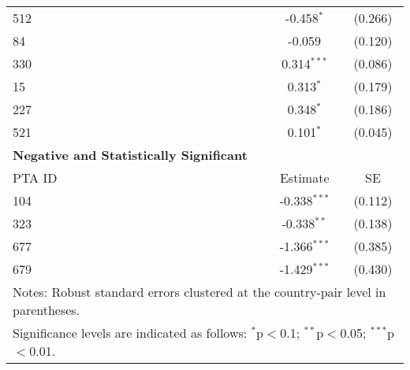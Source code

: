\begin{table}[htbp]
\begin{adjustbox}{max width=\textwidth}
\begin{tabular}{lcc}
    512 & -0.458$^{\ast}$ & (0.266) \\
    84  & -0.059 & (0.120) \\
    330 & 0.314$^{\ast\ast\ast}$ & (0.086) \\
    15  & 0.313$^{\ast}$ & (0.179) \\
    227 & 0.348$^{\ast}$ & (0.186) \\
    521 & 0.101$^{\ast}$ & (0.045) \\
    \hline
    \textbf{Negative and Statistically Significant} &  &  \\
    \hline
    PTA ID & Estimate & SE \\
    \hline
    104 & -0.338$^{\ast\ast\ast}$ & (0.112) \\
    323 & -0.338$^{\ast\ast}$ & (0.138) \\
    677 & -1.366$^{\ast\ast\ast}$ & (0.385) \\
    679 & -1.429$^{\ast\ast\ast}$ & (0.430) \\
    \hline
    \multicolumn{3}{l}{\footnotesize{Notes: Robust standard errors clustered at the country-pair level in parentheses.}} \\
    \multicolumn{3}{l}{\footnotesize{Significance levels are indicated as follows: $^{\ast}$p$<$0.1; $^{\ast\ast}$p$<$0.05; $^{\ast\ast\ast}$p$<$0.01.}} \\
    \end{tabular}
    \end{adjustbox}
\end{table}